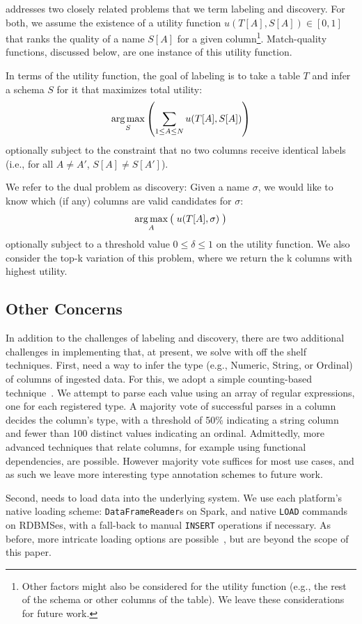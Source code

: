 \systemname addresses two closely related problems that we term labeling and discovery.
For both, we assume the existence of a utility function $u(T[A], S[A]) \in [0, 1]$ that ranks the quality of a name $S[A]$ for a given column\footnote{Other factors might also be considered for the utility function (e.g., the rest of the schema or other columns of the table).  We leave these considerations for future work.}.  
Match-quality functions, discussed below, are one instance of this utility function.

In terms of the utility function, the goal of labeling is to take a table $T$ and infer a schema $S$ for it that maximizes total utility:
$$\operatorname*{arg\,max}_{S}\left(\sum_{1 \leq A \leq N}u(T[A], S[A])\right)$$ 
optionally subject to the constraint that no two columns receive identical labels (i.e., for all $A \neq A'$, $S[A] \neq S[A']$).

We refer to the dual problem as discovery: Given a name $\sigma$, we would like to know which (if any) columns are valid candidates for $\sigma$:
$$\operatorname*{arg\,max}_{A}\big(\; u(T[A], \sigma)\;\big)$$
optionally subject to a threshold value $0 \leq \delta \leq 1$ on the utility function.  We also consider the top-k variation of this problem, where we return the k columns with highest utility.

\subsection{Other Concerns}
In addition to the challenges of labeling and discovery, there are two additional challenges in implementing \systemname that, at present, we solve with off the shelf techniques.
First, \systemname need a way to infer the type (e.g., Numeric, String, or Ordinal) of columns of ingested data.  
For this, we adopt a simple counting-based technique~\cite{yang2015lenses}.
We attempt to parse each value using an array of regular expressions, one for each registered type.
A majority vote of successful parses in a column decides the column's type, with a threshold of 50\% indicating a string column and fewer than 100 distinct values indicating an ordinal.
Admittedly, more advanced techniques that relate columns, for example using functional dependencies, are possible.
However majority vote suffices for most use cases, and as such we leave more interesting type annotation schemes to future work.

Second, \systemname needs to load data into the underlying system.  
We use each platform's native loading scheme: \texttt{DataFrameReader}s on Spark, and native \texttt{LOAD} commands on RDBMSes, with a fall-back to manual \texttt{INSERT} operations if necessary.
As before, more intricate loading options are possible~\cite{DBLP:conf/sigmod/AlagiannisBBIA12,DBLP:conf/cidr/IdreosKM07}, but are beyond the scope of this paper.







